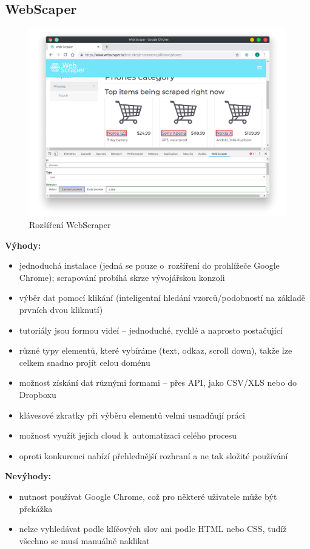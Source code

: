 \documentclass[thesis=B,czech]{FITthesis}[2012/06/26]
\begin{document}
\newpage
\subsection{WebScaper}
\begin{figure}
	\includegraphics[width=\linewidth]{images/WebScraper.png}
	\caption[Rozšíření WebScraper]{Rozšíření WebScraper~\cite[snímek pořídil autor]{webscraper}}
	\label{fig:webScraper}
\end{figure}
\textbf{Výhody:}
\begin{itemize}
	\item jednoduchá instalace (jedná se pouze o~rozšíření do prohlížeče Google Chrome); scrapování probíhá skrze vývojářskou konzoli
	\item výběr dat pomocí klikání (inteligentní hledání vzorců/podobností na základě prvních dvou kliknutí)
	\item tutoriály jsou formou videí -- jednoduché, rychlé a naprosto postačující
	\item různé typy elementů, které vybíráme (text, odkaz, scroll down), takže lze celkem snadno projít celou doménu
	\item možnost získání dat různými formami -- přes API, jako CSV/XLS nebo do Dropboxu
	\item klávesové zkratky při výběru elementů velmi usnadňují práci
	\item možnost využít jejich cloud k~automatizaci celého procesu
	\item oproti konkurenci nabízí přehlednější rozhraní a ne tak složité používání
\end{itemize}
\newpage
\textbf{Nevýhody:}
\begin{itemize}
	\item nutnost používat Google Chrome, což pro některé uživatele může být překážka
	\item nelze vyhledávat podle klíčových slov ani podle HTML nebo CSS, tudíž všechno se musí manuálně naklikat
\end{itemize}
\end{document}
